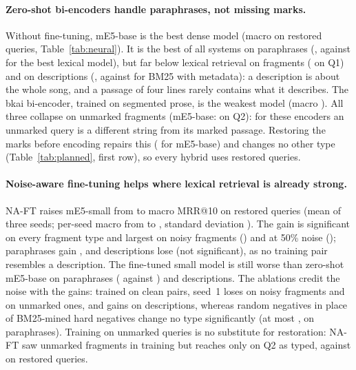 \documentclass[11pt]{article}
\makeatletter
\newcommand{\Qone}{Q1\xspace}
\newcommand{\Qtwo}{Q2\xspace}
\newcommand{\mrr}{MRR@10\xspace}
\makeatother
\begin{document}
\paragraph{Zero-shot bi-encoders handle paraphrases, not missing marks.} Without fine-tuning, mE5-base is the
best dense model (macro \MDenseEbaseRestMacro{} on restored queries, Table~\ref{tab:neural}). It is the best
of all systems on paraphrases (\MDenseEbaseFour, against \BestLexQfour{} for the best lexical model), but far
below lexical retrieval on fragments (\MDenseEbaseOne{} on \Qone) and on descriptions (\MDenseEbaseFive,
against \MLyrMetaFive{} for BM25 with metadata): a description is about the whole song, and a passage of four
lines rarely contains what it describes. The bkai bi-encoder, trained on segmented prose, is the weakest
model (macro \MDenseBkaiMacro). All three collapse on unmarked fragments (mE5-base: \MDenseEbaseTwo{} on
\Qtwo): for these encoders an unmarked query is a different string from its marked passage. Restoring the
marks before encoding repairs this (\MDenseEbaseRestTwo{} for mE5-base) and changes no other type
(Table~\ref{tab:planned}, first row), so every hybrid uses restored queries.

\paragraph{Noise-aware fine-tuning helps where lexical retrieval is already strong.} NA-FT raises mE5-small
from \MDenseEsmallRestMacro{} to \MNaftRestMacro{} macro \mrr{} on restored queries (mean of three seeds;
per-seed macro from \NaftRestSeedMin{} to \NaftRestSeedMax, standard deviation \NaftRestSeedSd). The gain is
significant on every fragment type and largest on noisy fragments (\PlNaftThree) and at 50\% noise
(\PlNaftNFifty); paraphrases gain \PlNaftFour, and descriptions lose \PlNaftFive{} (not significant), as no
training pair resembles a description. The fine-tuned small model is still worse than zero-shot mE5-base on
paraphrases (\MNaftRestFour{} against \MDenseEbaseRestFour) and descriptions. The ablations credit the noise
with the gains: trained on clean pairs, seed~1 loses \PlNonoiseThree{} on noisy fragments and \PlNonoiseTwo{}
on unmarked ones, and gains \PlNonoiseFive{} on descriptions, whereas random negatives in place of
BM25-mined hard negatives change no type significantly (at most \PlRandnegFour, on paraphrases). Training on
unmarked queries is no substitute for restoration: NA-FT saw unmarked fragments in training but reaches only
\MNaftTwo{} on \Qtwo{} as typed, against \MNaftRestTwo{} on restored queries.
\end{document}
